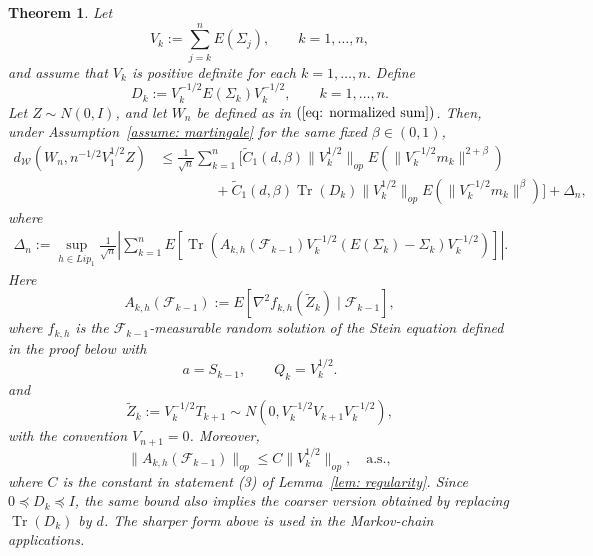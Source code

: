 \documentclass[10pt,a4paper]{article}
\newtheorem{theorem}{Theorem}
\begin{document}
\begin{theorem}\label{thm: martingale CLT}
Let
\[
    V_k:=\sum_{j=k}^n E(\Sigma_j),
    \qquad k=1,\ldots,n,
\]
and assume that \(V_k\) is positive definite for each \(k=1,\ldots,n\).  Define
\[
    D_k:=V_k^{-1/2}E(\Sigma_k)V_k^{-1/2},
    \qquad k=1,\ldots,n .
\]
Let \(Z\sim N(0,I)\), and let \(W_n\) be defined as in
\((\ref{eq: normalized sum})\). Then, under
Assumption~\ref{assume: martingale} for the same fixed \(\beta\in(0,1)\),
\begin{align*}
   d_{\mathcal W}(W_n,n^{-1/2}V_1^{1/2}Z)
   &\le
   \frac{1}{\sqrt n}\sum_{k=1}^n
   \Biggl[
   \tilde C_1(d,\beta)\|V_k^{1/2}\|_{op}
   E\left(\|V_k^{-1/2}m_k\|^{2+\beta}\right)
   \\
   &\qquad\qquad
   +
   \tilde C_1(d,\beta)\operatorname{Tr}(D_k)\|V_k^{1/2}\|_{op}
   E\left(\|V_k^{-1/2}m_k\|^\beta\right)
   \Biggr]
   +\Delta_n,
\end{align*}
where
\begin{align*}
\Delta_n
:=
\sup_{h\in Lip_1}
\frac{1}{\sqrt n}
\left|
\sum_{k=1}^n
E\left[
\operatorname{Tr}\left(
A_{k,h}(\mathcal F_{k-1})
V_k^{-1/2}
\left(E(\Sigma_k)-\Sigma_k\right)
V_k^{-1/2}
\right)
\right]
\right|.
\end{align*}
Here
\[
A_{k,h}(\mathcal F_{k-1})
:=
E\left[
\nabla^2 f_{k,h}(\widetilde Z_k)
\mid
\mathcal F_{k-1}
\right],
\]
where \(f_{k,h}\) is the $\mathcal F_{k-1}$-measurable random solution of
the Stein equation defined in the proof below with
\[
    a=S_{k-1},
    \qquad
    Q_k=V_k^{1/2}.
\]
and
\[
    \widetilde Z_k
    :=
    V_k^{-1/2}T_{k+1}
    \sim
    N\left(0,V_k^{-1/2}V_{k+1}V_k^{-1/2}\right),
\]
with the convention \(V_{n+1}=0\). Moreover,
\[
    \|A_{k,h}(\mathcal F_{k-1})\|_{op}
    \le
    C\|V_k^{1/2}\|_{op}, \quad \text{a.s.},
\]
where \(C\) is the constant in statement (3) of Lemma~\ref{lem: regularity}.
Since \(0\preceq D_k\preceq I\), the same bound also implies the coarser
version obtained by replacing \(\operatorname{Tr}(D_k)\) by \(d\).  The sharper
form above is used in the Markov-chain applications.
\end{theorem}
\end{document}
